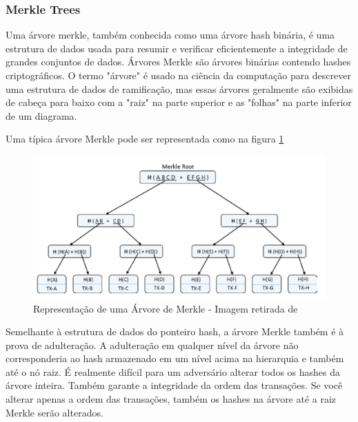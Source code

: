         \subsubsection{Merkle Trees}
  
            Uma árvore merkle, também conhecida como uma árvore hash binária, é uma estrutura de dados usada para resumir e verificar eficientemente a integridade de grandes conjuntos de dados. Árvores Merkle são árvores binárias contendo hashes criptográficos. O termo "árvore" é usado na ciência da computação para descrever uma estrutura de dados de ramificação, mas essas árvores geralmente são exibidas de cabeça para baixo com a "raiz" na parte superior e as "folhas" na parte inferior de um diagrama.\cite{mastering_blockchain_andreas}
            
            Uma típica árvore Merkle pode ser representada como na figura \ref{fig:merkle_tree_representation}
        
                \begin{figure}[H]
                     \centering
                     \includegraphics[scale=0.7]{figuras/capitulo_2/merkle_tree_representation.png}
                     \caption{Representação de uma Árvore de Merkle - Imagem retirada de \cite{beginnig_blockchain_bikramaditya}}
                     \label{fig:merkle_tree_representation}
                \end{figure}

            Semelhante à estrutura de dados do ponteiro hash, a árvore Merkle também é à prova de adulteração. A adulteração em qualquer nível da árvore não corresponderia ao hash armazenado em um nível acima na hierarquia e também até o nó raiz. É realmente difícil para um adversário alterar todos os hashes da árvore inteira. Também garante a integridade da ordem das transações. Se você alterar apenas a ordem das transações, também os hashes na árvore até a raiz Merkle serão alterados.\cite{beginnig_blockchain_bikramaditya}


